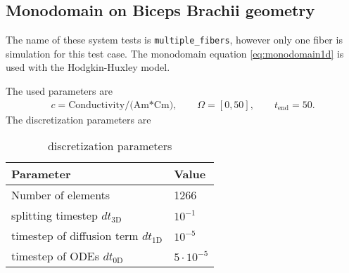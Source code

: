 %
\clearpage
%
%
%
%
\begin{frame}
 \section{Monodomain on Biceps Brachii geometry}
   The name of these system tests is \lstinline{multiple_fibers}, however only one fiber is simulation for this test case.
  The monodomain equation \eqref{eq:monodomain1d} is used with the Hodgkin-Huxley model.
  
  The used parameters are
  \begin{equation*}
    \begin{array}{lll}
      c = \text{Conductivity/(Am*Cm)},\qquad \Omega = [0,50], \qquad t_\text{end}=50.
    \end{array}
  \end{equation*}
  The discretization parameters are
  \begin{table}[h!]
    \begin{center}
      \begin{tabular}{l|l}
        \textbf{Parameter} & \textbf{Value}\\
        \hline
        Number of elements & 1266\\
        splitting timestep $dt_\text{3D}$ & $10^{-1}$\\
        timestep of diffusion term $dt_\text{1D}$ & $10^{-5}$\\
        timestep of ODEs $dt_\text{0D}$ & $5\cdot 10^{-5}$
      \end{tabular}
    \end{center}
    \caption{discretization parameters}
    \label{tab:table_monodomain2}
  \end{table}
\end{frame}
%
%
%
%
